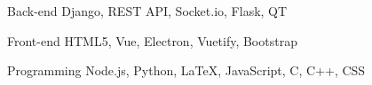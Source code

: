 

\begin{cvskills}

  \cvskill
    {Back-end} %
    {Django, REST API, Socket.io, Flask, QT} %

  \cvskill
    {Front-end} %
    {HTML5, Vue, Electron, Vuetify, Bootstrap} %

  \cvskill
    {Programming} %
    {Node.js, Python, LaTeX, JavaScript, C, C++, CSS} %

\end{cvskills}